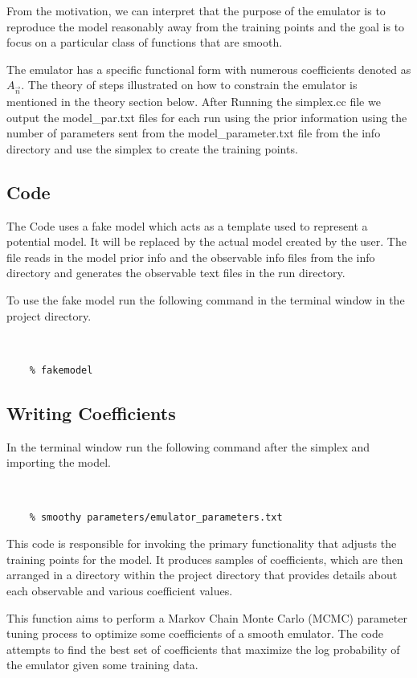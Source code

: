 \documentclass[12pt]{article}
\numberwithin{equation}{section}
\numberwithin{figure}{section}
\begin{document}
From the motivation, we can interpret that the purpose of the emulator is to reproduce the model reasonably away from the training points and the goal is to focus on a particular class of functions that are smooth. 

The emulator has a specific functional form with numerous coefficients denoted as $A_{\vec{n}}$. The theory of steps illustrated on how to constrain the emulator is mentioned in the theory section below.  After Running the simplex.cc file we output the model\_par.txt files for each run using the prior information using the number of parameters sent from the model\_parameter.txt file from the info directory and use the simplex to create the training points.

\subsection{Code}

The Code uses a fake model which acts as a template used to represent a potential model. It will be replaced by the actual model created by the user. The file reads in the model prior info and the observable info files from the info directory and generates the observable text files in the run directory. 

To use the fake model run the following command in the terminal window in the project directory. 

{\tt 
\begin{verbatim}
    % fakemodel 
\end{verbatim}
}
 
\subsection{Writing Coefficients}

In the terminal window run the following command after the simplex and importing the model.

{\tt 
\begin{verbatim}
    % smoothy parameters/emulator_parameters.txt 
\end{verbatim}
}

This code is responsible for invoking the primary functionality that adjusts the training points for the model. It produces samples of coefficients, which are then arranged in a directory within the project directory that provides details about each observable and various coefficient values.

This function aims to perform a Markov Chain Monte Carlo (MCMC) parameter tuning process to optimize some coefficients of a smooth emulator. The code attempts to find the best set of coefficients that maximize the log probability of the emulator given some training data. 
\end{document}
